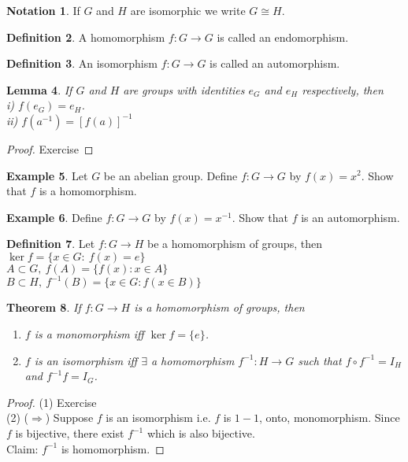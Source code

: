 \documentclass[leqno,DIV=calc,paper=a4,fontsize=11pt]{article}
\newtheorem{thm}{Theorem}[section]
\newtheorem{lem}[thm]{Lemma}
\theoremstyle{definition}
\newtheorem{defn}[thm]{Definition}
\newtheorem{exmp}[thm]{Example}
\newtheorem{notn}[thm]{Notation}
\theoremstyle{plain}
\theoremstyle{remark}
\begin{document}
\begin{notn}
If $G$ and $H$ are isomorphic we write $G\cong H$.
\end{notn}
\begin{defn}
A homomorphism $f:G\to G$ is called an endomorphism.
\end{defn}
\begin{defn}
An isomorphism $f:G\to G$ is called an automorphism.
\end{defn}
\begin{lem}
If $G$ and $H$ are groups with identities $e_G$ and $e_H$ respectively, then\\
i) $f(e_G)=e_H$.\\
ii) $f(a^{-1})=[f(a)]^{-1}$
\end{lem}

\begin{proof}
Exercise
\end{proof}

 \begin{exmp}
 Let $G$ be an abelian group. Define $f:G\to G$ by $f(x)=x^2$. Show that $f$ is a homomorphism.
 \end{exmp}
 \begin{exmp}
 Define $f:G\to G$ by $f(x)=x^{-1}$. Show that $f$ is an automorphism.
 \end{exmp}
 \begin{defn}
 Let $f:G\to H$ be a homomorphism of groups, then
 $\ker f=\{x\in G:\ f(x)=e\}$\\
 $A\subset G,\ f(A)=\{f(x):x\in A\}$\\
 $B\subset H,\ f^{-1}(B)=\{x\in G:f(x\in B)\}$
 \end{defn}

 \begin{thm}
 If $f:G\to H$ is a homomorphism of groups, then\\
 \begin{enumerate}
   \item $f$ is a monomorphism iff $\ker f=\{e\}$.
   \item $f$ is an isomorphism iff $\exists$  a homomorphism $f^{-1}:H\to G$ such that $f\circ f^{-1}=I_H$ and $f^{-1}f=I_G$.
 \end{enumerate}
 \end{thm}
\begin{proof}
(1) Exercise\\
(2) ($\Rightarrow$) Suppose $f$ is an isomorphism i.e. $f$ is $1-1$, onto, monomorphism. Since $f$ is bijective, there exist $f^{-1}$ which is also bijective.\\
Claim: $f^{-1}$ is homomorphism.
\end{proof}
\end{document}
